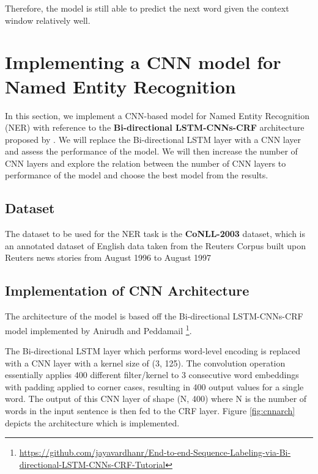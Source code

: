 \documentclass[sigconf,nonacm=true]{acmart}
\begin{document}
Therefore, the model is still able to predict the next word given the context window relatively well.


\section{Implementing a CNN model for Named Entity Recognition}
In this section, we implement a CNN-based model for Named Entity Recognition (NER) with reference to the \textbf{Bi-directional LSTM-CNNs-CRF} architecture proposed by \citet{ma2016endtoend}. We will replace the Bi-directional LSTM layer with a CNN layer and assess the performance of the model. We will then increase the number of CNN layers and explore the relation between the number of CNN layers to performance of the model and choose the best model from the results.

\subsection{Dataset}
The dataset to be used for the NER task is the \textbf{CoNLL-2003} dataset, which is an annotated dataset of English data taken from the Reuters Corpus built upon Reuters news stories from August 1996 to August 1997 \cite{DBLP:journals/corr/cs-CL-0306050}

\subsection{Implementation of CNN Architecture}
\label{subsection:cnnimpl}
The architecture of the model is based off the Bi-directional LSTM-CNNs-CRF model implemented by Anirudh and Peddamail \footnote[1]{\url{https://github.com/jayavardhanr/End-to-end-Sequence-Labeling-via-Bi-directional-LSTM-CNNs-CRF-Tutorial}}.

The Bi-directional LSTM layer which performs word-level encoding is replaced with a CNN layer with a kernel size of (3, 125). The convolution operation essentially applies 400 different filter/kernel to 3 consecutive word embeddings with padding applied to corner cases, resulting in 400 output values for a single word. The output of this CNN layer of shape (N, 400) where N is the number of words in the input sentence is then fed to the CRF layer. Figure \ref{fig:cnnarch} depicts the architecture which is implemented. 
\end{document}
